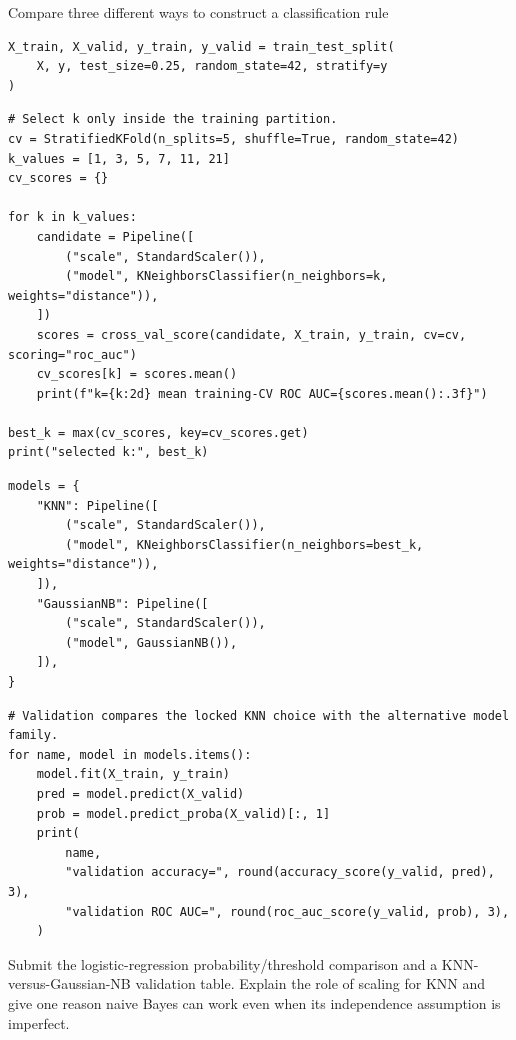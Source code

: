 \begin{labproject}{Compare three different ways to construct a classification rule}
\begin{lstlisting}[style=mlpython]
X_train, X_valid, y_train, y_valid = train_test_split(
    X, y, test_size=0.25, random_state=42, stratify=y
)
\end{lstlisting}

\begin{lstlisting}[style=mlpython]
# Select k only inside the training partition.
cv = StratifiedKFold(n_splits=5, shuffle=True, random_state=42)
k_values = [1, 3, 5, 7, 11, 21]
cv_scores = {}

for k in k_values:
    candidate = Pipeline([
        ("scale", StandardScaler()),
        ("model", KNeighborsClassifier(n_neighbors=k, weights="distance")),
    ])
    scores = cross_val_score(candidate, X_train, y_train, cv=cv, scoring="roc_auc")
    cv_scores[k] = scores.mean()
    print(f"k={k:2d} mean training-CV ROC AUC={scores.mean():.3f}")

best_k = max(cv_scores, key=cv_scores.get)
print("selected k:", best_k)
\end{lstlisting}

\begin{lstlisting}[style=mlpython]
models = {
    "KNN": Pipeline([
        ("scale", StandardScaler()),
        ("model", KNeighborsClassifier(n_neighbors=best_k, weights="distance")),
    ]),
    "GaussianNB": Pipeline([
        ("scale", StandardScaler()),
        ("model", GaussianNB()),
    ]),
}
\end{lstlisting}

\begin{lstlisting}[style=mlpython]
# Validation compares the locked KNN choice with the alternative model family.
for name, model in models.items():
    model.fit(X_train, y_train)
    pred = model.predict(X_valid)
    prob = model.predict_proba(X_valid)[:, 1]
    print(
        name,
        "validation accuracy=", round(accuracy_score(y_valid, pred), 3),
        "validation ROC AUC=", round(roc_auc_score(y_valid, prob), 3),
    )
\end{lstlisting}

\end{labproject}

\begin{labdeliverable}
Submit the logistic-regression probability/threshold comparison and a KNN-versus-Gaussian-NB validation table. Explain the role of scaling for KNN and give one reason naive Bayes can work even when its independence assumption is imperfect.
\end{labdeliverable}
